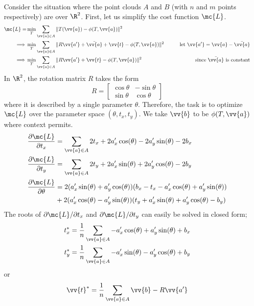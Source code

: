 \documentclass[12pt]{article}
\theoremstyle{defstyle}
\begin{document}
Consider the situation where the point clouds $A$ and $B$ (with $n$ and $m$ points respectively) are over $\R^2$.
First, let us simplify the cost function $\mc{L}$.
\begin{alignat*}{2}
    \mc{L} = & \min\limits_{\substack{T}} \sum_{\vv{a} \in A} \| T(\vv{a}) - \phi(T, \vv{a}) \|^2                                                                              \\
    \implies & \min\limits_{\substack{T}} \sum_{\vv{a} \in A} \| R\vv{a'} + \bar{\vv{a}} + \vv{t} - \phi(T, \vv{a}) \|^2 & \qquad \text{let $\vv{a'} = \vv{a} - \bar{\vv{a}}$} \\
    \implies & \min\limits_{\substack{T}} \sum_{\vv{a} \in A} \| R\vv{a'} + \vv{t} - \phi(T, \vv{a}) \|^2                & \qquad \text{since $\bar{\vv{a}}$ is constant}
\end{alignat*}
In $\R^2$, the rotation matrix $R$ takes the form
\[
    R = \begin{bmatrix}
        \cos \theta & -\sin \theta \\
        \sin \theta & \cos \theta
    \end{bmatrix}
\]
where it is described by a single parameter $\theta$.
Therefore, the task is to optimize $\mc{L}$ over the parameter space $(\theta, t_x, t_y)$.
We take $\vv{b}$ to be $\phi(T, \vv{a})$ where context permits.
\begin{align*}
    \frac{\partial \mc{L}}{\partial t_x}    & =     \sum_{\vv{a} \in A} 2t_x + 2a'_x\cos(\theta) - 2a'_y\sin(\theta) -2b_x               \\
    \frac{\partial \mc{L}}{\partial t_y}    & =     \sum_{\vv{a} \in A} 2t_y + 2a'_x\sin(\theta) + 2a'_y\cos(\theta) -2b_y               \\
    \frac{\partial \mc{L}}{\partial \theta} & = 2(a'_x\sin(\theta) + a'_y\cos(\theta))(b_x - t_x - a'_x\cos(\theta) + a'_y\sin(\theta))  \\
                                            & + 2(a'_x\cos(\theta) - a'_y \sin(\theta))(t_y + a'_x\sin(\theta) + a'_y\cos(\theta) - b_y)
\end{align*}
The roots of $\partial \mc{L}/\partial t_x$ and $\partial \mc{L}/\partial t_y$ can easily be solved in closed form;
\begin{gather*}
    t_x^* = \frac{1}{n} \sum_{\vv{a} \in A} -a'_x\cos(\theta) + a'_y\sin(\theta) + b_x \\
    t_y^* = \frac{1}{n} \sum_{\vv{a} \in A} -a'_x\sin(\theta) - a'_y\cos(\theta) + b_y
\end{gather*}
or
\[
    \vv{t}^* = \frac{1}{n} \sum_{\vv{a} \in A} \vv{b} - R \vv{a'}
\]
\end{document}
